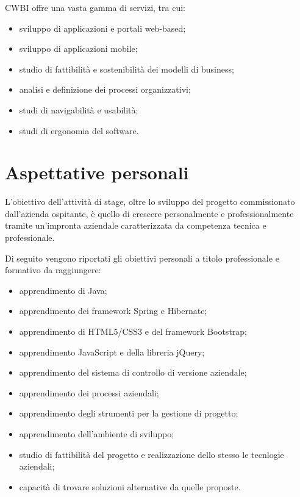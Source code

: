 \setlength{\parskip}{3ex}

\pagebreak

\noindent CWBI offre una vasta gamma di servizi, tra cui:
\begin{itemize}
\item sviluppo di applicazioni e portali web-based;
\item sviluppo di applicazioni mobile;
\item studio di fattibilità e sostenibilità dei modelli di business;
\item analisi e definizione dei processi organizzativi;
\item studi di navigabilità e usabilità;
\item studi di ergonomia del software.
\end{itemize}

\section{Aspettative personali}
L'obiettivo dell'attività di stage, oltre lo sviluppo del progetto commissionato dall'azienda ospitante, è quello di crescere personalmente e professionalmente tramite un'impronta aziendale caratterizzata da competenza tecnica e professionale.

\setlength{\parskip}{3ex}

\noindent Di seguito vengono riportati gli obiettivi personali a titolo professionale e formativo da raggiungere:
\begin{itemize}
\item apprendimento di Java;
\item apprendimento dei framework Spring e Hibernate;
\item apprendimento di HTML5/CSS3 e del framework Bootstrap;
\item apprendimento JavaScript e della libreria jQuery;
\item apprendimento del sistema di controllo di versione aziendale;
\item apprendimento dei processi aziendali;
\item apprendimento degli strumenti per la gestione di progetto;
\item apprendimento dell’ambiente di sviluppo;
\item studio di fattibilità del progetto e realizzazione dello stesso le tecnlogie aziendali;
\item capacità di trovare soluzioni alternative da quelle proposte.
\end{itemize}

